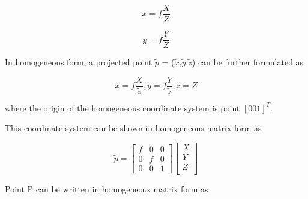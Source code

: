 \documentclass[12pt,a4paper,oneside,pdftex]{report}
\begin{document}
\begin{equation}
x = f\frac{X}{Z}
\label{eq:image_projection}
\end{equation}

\begin{equation}
y = f\frac{Y}{Z}
\label{eq:image_projection2}
\end{equation}


In homogeneous form, a projected point $\tilde{p}$ = ($\tilde{x}$,$\tilde{y}$,$\tilde{z}$) can be further formulated as

\begin{equation}
\tilde{x} = f\frac{X}{\tilde{z}}, \tilde{y} = f\frac{Y}{\tilde{z}}, \tilde{z} = Z
\label{eq:image_projection}
\end{equation}

where the origin of the homogeneous coordinate system is point $[0 0 1]^T$.


This coordinate system can be shown in homogeneous matrix form as 

\begin{equation} \tilde{p} =
\label{eq:homogeneous_matrix_form}
\begin{bmatrix}
f & 0 & 0 \\
0 & f & 0 \\
0 & 0 & 1\end{bmatrix}
\begin{bmatrix}
X \\
Y \\
Z \\
\end{bmatrix}
\end{equation}

Point P can be written in homogeneous matrix form as
\end{document}

